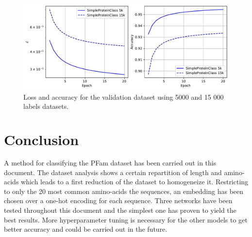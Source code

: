 \documentclass[12pt]{article}
\begin{document}
\begin{figure}[htbp]
    \centering
    \includegraphics[width=\textwidth]{figures/loss_acc_nlabels_valid.pdf}
    \caption{Loss and accuracy for the validation dataset using 5000 and 15 000
    labels datasets.}
    \label{fig:simple_nlabels}
\end{figure}

\section{Conclusion}

A method for classifying the PFam dataset has been carried out in this document. The dataset analysis shows a certain repartition of length and amino-acids which leads to a first reduction of the dataset to homogeneize it. Restricting to only the 20 most common amino-acids the sequences, an embedding has been chosen over a one-hot encoding for each sequence. Three networks have been tested throughout this document and the simplest one has proven to yield the best results. More hyperparameter tuning is necessary for the other models to get better accuracy and could be carried out in the future.


\clearpage



\end{document}
